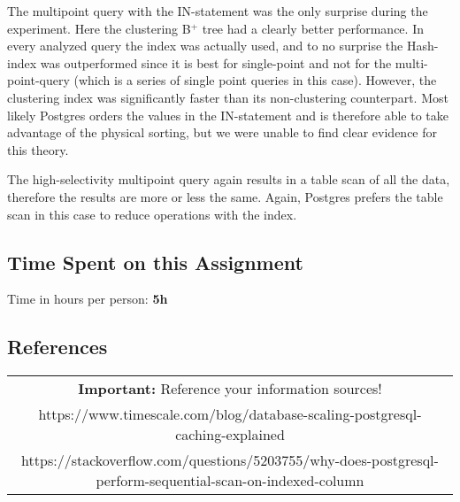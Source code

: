 \documentclass[11pt]{scrartcl}
\begin{document}
The multipoint query with the IN-statement was the only surprise during the experiment. Here the clustering B$^+$ tree had a clearly better performance. In every analyzed query the index was actually used, and to no surprise the Hash-index was outperformed since it is best for single-point and not for the multi-point-query (which is a series of single point queries in this case). However, the clustering index was significantly faster than its non-clustering counterpart. Most likely Postgres orders the values in the IN-statement and is therefore able to take advantage of the physical sorting, but we were unable to find clear evidence for this theory.

The high-selectivity multipoint query again results in a table scan of all the data, therefore the results are more or less the same. Again, Postgres prefers the table scan in this case to reduce operations with the index.

\subsection*{Time Spent on this Assignment}

Time in hours per person: \textbf{5h}

\subsection*{References}

\begin{table}[H]
  \centering
  \begin{tabular}{c}
    \hline
    \textbf{Important:} Reference your information sources! \tabularnewline
    https://www.timescale.com/blog/database-scaling-postgresql-caching-explained \tabularnewline
    https://stackoverflow.com/questions/5203755/why-does-postgresql-perform-sequential-scan-on-indexed-column \tabularnewline
    \hline
  \end{tabular}
\end{table}
\end{document}
